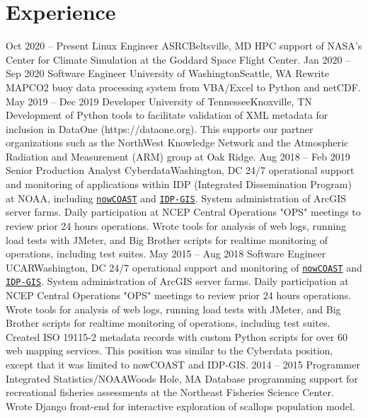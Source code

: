 \documentclass[11pt]{moderncv}  %
\begin{document}
\section{Experience}
\cventry
{Oct 2020 -- Present}
{Linux Engineer}
{ASRC}{Beltsville, MD}{}
{
    HPC support of NASA's Center for Climate Simulation at the Goddard
    Space Flight Center.
}
\cventry
{Jan 2020 -- Sep 2020}
{Software Engineer}
{University of Washington}{Seattle, WA}{}
{
    Rewrite MAPCO2 buoy data processing system from VBA/Excel to Python
    and netCDF.
}
\cventry
{May 2019 -- Dec 2019}
{Developer}
{University of Tennessee}{Knoxville, TN}{}
{
Development of Python tools to facilitate validation of XML metadata for inclusion in DataOne (https://dataone.org).  This supports our partner organizations such as the NorthWest Knowledge Network and the Atmospheric Radiation and Measurement (ARM) group at Oak Ridge.
}
\cventry
{Aug 2018 -- Feb 2019}
{Senior Production Analyst}
{Cyberdata}{Washington, DC}{}
{
24/7 operational support and monitoring of applications within IDP (Integrated Dissemination Program) at NOAA, including \href{https://nowcoast.noaa.gov}{\texttt{nowCOAST}} and \href{https://idpgis.ncep.noaa.gov}{\texttt{IDP-GIS}}.  System administration of ArcGIS server farms.  Daily participation at NCEP Central Operations "OPS" meetings to review prior 24 hours operations.  Wrote tools for analysis of web logs, running load tests with JMeter, and Big Brother scripts for realtime monitoring of operations, including test suites.  
}
\cventry
{May 2015 -- Aug 2018}
{Software Engineer}
{UCAR}{Washington, DC}{}
{
	24/7 operational support and monitoring of 
	\href{https://nowcoast.noaa.gov}{\texttt{nowCOAST}}
	and
	\href{https://idpgis.ncep.noaa.gov}{\texttt{IDP-GIS}}.
	System administration of ArcGIS server farms.  Daily
	participation at NCEP Central Operations "OPS" meetings to
	review prior 24 hours operations.  Wrote tools for analysis
	of web logs, running load tests with JMeter, and Big Brother
	scripts for realtime monitoring of operations, including
	test suites.  Created ISO 19115-2 metadata records with
	custom Python scripts for over 60 web mapping services.
	This position was similar to the Cyberdata position, except that
	it was limited to nowCOAST and IDP-GIS.
}
\cventry
{2014 -- 2015}
{Programmer}
{Integrated Statistics/NOAA}{Woods Hole, MA}{}
{
Database programming support for recreational fisheries assessments
at the Northeast Fisheries Science Center. Wrote Django front-end for
interactive exploration of scallops population model.
}
\end{document}
